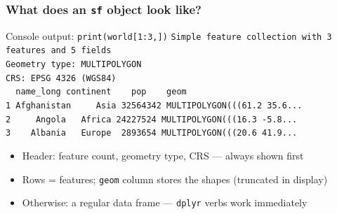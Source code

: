 \begin{frame}
\frametitle{What does an \texttt{sf} object look like?}
\centering

\vspace{6pt}

\begin{block}{Console output: \texttt{print(world[1:3,])}}
\texttt{\footnotesize Simple feature collection with 3 features and 5 fields}\\
\texttt{\footnotesize Geometry type: MULTIPOLYGON}\\
\texttt{\footnotesize CRS: EPSG 4326 (WGS84)}\\[4pt]
\texttt{\footnotesize \ \ name\_long continent \ \ \ pop \ \ \ geom}\\
\texttt{\footnotesize 1 Afghanistan \ \ \ \ Asia 32564342 MULTIPOLYGON(((61.2 35.6...}\\
\texttt{\footnotesize 2 \ \ \ \ Angola \ \ Africa 24227524 MULTIPOLYGON(((16.3 -5.8...}\\
\texttt{\footnotesize 3 \ \ \ Albania \ \ Europe \ 2893654 MULTIPOLYGON(((20.6 41.9...}
\end{block}

\vspace{8pt}

\begin{itemize}[<+->]
\item Header: feature count, geometry type, CRS --- always shown first
\item Rows = features; \texttt{geom} column stores the shapes (truncated in display)
\item Otherwise: a regular data frame --- \texttt{dplyr} verbs work immediately
\end{itemize}

\end{frame}

